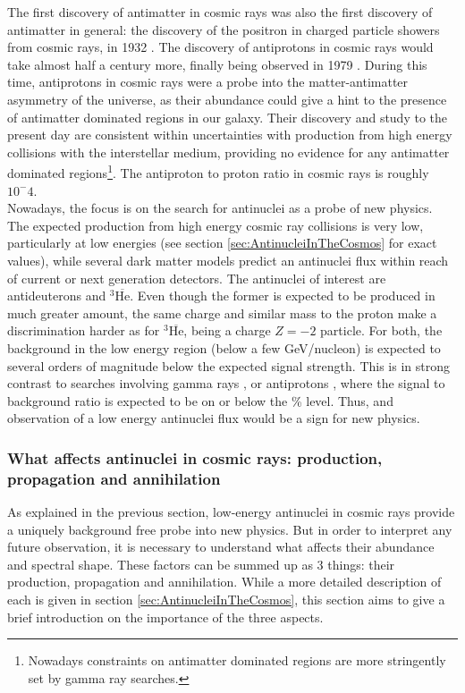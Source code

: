 The first discovery of antimatter in cosmic rays was also the first discovery of antimatter in general: the discovery of the positron in charged particle showers from cosmic rays, in 1932 \cite{positron_discovery}. The discovery of antiprotons in cosmic rays would take almost half a century more, finally being observed in 1979 \cite{antiproton_CR_discovery, Bogomolov:1979hu}. During this time, antiprotons in cosmic rays were a probe into the matter-antimatter asymmetry of the universe, as their abundance could give a hint to the presence of antimatter dominated regions in our galaxy. Their discovery and study to the present day are consistent within uncertainties with production from high energy collisions with the interstellar medium, providing no evidence for any antimatter dominated regions\footnote{Nowadays constraints on antimatter dominated regions are more stringently set by gamma ray searches.}. The antiproton to proton ratio in cosmic rays is roughly $10^-{4}$. \\

Nowadays, the focus is on the search for antinuclei as a probe of new physics. The expected production from high energy cosmic ray collisions is very low, particularly at low energies (see section \ref{sec:AntinucleiInTheCosmos} for exact values), while several dark matter models predict an antinuclei flux within reach of current or next generation detectors\cite{Doetinchem_2020_review}. The antinuclei of interest are antideuterons and $^3\overline{\mathrm{He}}$. Even though the former is expected to be produced in much greater amount, the same charge and similar mass to the proton make a discrimination harder as for $^3\overline{\mathrm{He}}$, being a charge $Z=-2$ particle. For both, the background in the low energy region (below a few GeV/nucleon) is expected to several orders of magnitude below the expected signal strength. This is in strong contrast to searches involving gamma rays \cite{}, or antiprotons \cite{}, where the signal to background ratio is expected to be on or below the \% level. Thus, and observation of a low energy antinuclei flux would be a sign for new physics. 

\subsubsection{ What affects antinuclei in cosmic rays: production, propagation and annihilation}
As explained in the previous section, low-energy antinuclei in cosmic rays provide a uniquely background free probe into new physics. But in order to interpret any future observation, it is necessary to understand what affects their abundance and spectral shape. These factors can be summed up as 3 things: their production, propagation and annihilation. While a more detailed description of each is given in section \ref{sec:AntinucleiInTheCosmos}, this section aims to give a brief introduction on the importance of the three aspects. \\

